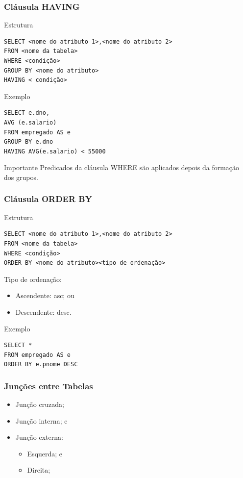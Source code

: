 \documentclass{beamer}
\begin{document}
\begin{frame}[fragile]
\frametitle{Cláusula HAVING}

\begin{block}{Estrutura}
	\begin{lstlisting}
SELECT <nome do atributo 1>,<nome do atributo 2>
FROM <nome da tabela>
WHERE <condição>
GROUP BY <nome do atributo>
HAVING < condição>
	\end{lstlisting}
\end{block}\vfill

\begin{exampleblock}{Exemplo}
	\begin{lstlisting}
SELECT e.dno,
AVG (e.salario)
FROM empregado AS e
GROUP BY e.dno
HAVING AVG(e.salario) < 55000
	\end{lstlisting}
\end{exampleblock}\vfill

\begin{alertblock}{Importante}
Predicados da cláusula WHERE são aplicados depois da formação dos
grupos.
\end{alertblock}
\end{frame}

\begin{frame}[fragile]
\frametitle{Cláusula ORDER BY}

\begin{block}{Estrutura}
	\begin{lstlisting}
SELECT <nome do atributo 1>,<nome do atributo 2>
FROM <nome da tabela>
WHERE <condição>
ORDER BY <nome do atributo><tipo de ordenação>
	\end{lstlisting}
\end{block}\vfill

Tipo de ordenação:
\begin{itemize}
	\item Ascendente: asc; ou
	\item Descendente: desc.
\end{itemize}\vfill

\begin{exampleblock}{Exemplo}
	\begin{lstlisting}
SELECT *
FROM empregado AS e
ORDER BY e.pnome DESC
	\end{lstlisting}
\end{exampleblock}
\end{frame}

\begin{frame}
\frametitle{Junções entre Tabelas}

\begin{itemize}
	\item Junção cruzada;
	\item Junção interna; e
	\item Junção externa:
	\begin{itemize}
		\item 	Esquerda; e
		\item Direita;
	\end{itemize}
\end{itemize}
\end{frame}
\end{document}
